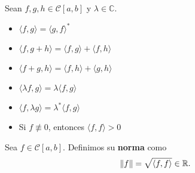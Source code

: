 \begin{propo} \label{ProductoEscalar}
 Sean $f,g,h \in \mathscr{C}[a,b]$ y  $\lambda \in \mathbb{C}$.
 
 \begin{itemize}
     \item $\langle f , g \rangle = \langle g, f \rangle^*$
     \item $\langle f , g + h \rangle = \langle f , g \rangle + \langle f , h \rangle$
     \item $\langle f + g , h \rangle = \langle f , h \rangle + \langle g , h \rangle$
     \item $\langle \lambda f , g \rangle = \lambda \langle f , g \rangle$
     \item $\langle  f , \lambda g \rangle = \lambda^*\langle f , g \rangle$
     \item Si $f \not\equiv 0$, entonces $\langle f , f \rangle > 0$
 \end{itemize}
\end{propo}









\begin{defi}
Sea $f \in \mathscr{C}[a,b]$. Definimos su \textbf{norma} como
$$\lVert f\rVert = \sqrt{\langle f,f \rangle} \in \mathbb{R}.$$
\end{defi}

